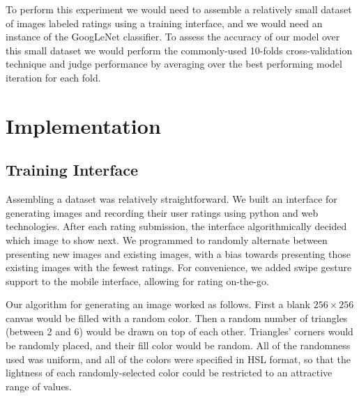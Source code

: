 \documentclass[midd]{thesis}
\begin{document}
To perform this experiment we would need to assemble a relatively small dataset of images labeled ratings using a training interface, and we would need an instance of the GoogLeNet classifier. To assess the accuracy of our model over this small dataset we would perform the commonly-used 10-folds cross-validation technique and judge performance by averaging over the best performing model iteration for each fold.























\chapter{Implementation}
\section{Training Interface}

Assembling a dataset was relatively straightforward. We built an interface for generating images and recording their user ratings using python and web technologies. After each rating submission, the interface algorithmically decided which image to show next. We programmed to randomly alternate between presenting new images and existing images, with a bias towards presenting those existing images with the fewest ratings.
For convenience, we added swipe gesture support to the mobile interface, allowing for rating on-the-go.

Our algorithm for generating an image worked as follows. First a blank $256\times 256$ canvas would be filled with a random color. Then a random number of triangles (between 2 and 6) would be drawn on top of each other. Triangles' corners would be randomly placed, and their fill color would be random. All of the randomness used was uniform, and all of the colors were specified in HSL format, so that the lightness of each randomly-selected color could be restricted to an attractive range of values.
\end{document}
